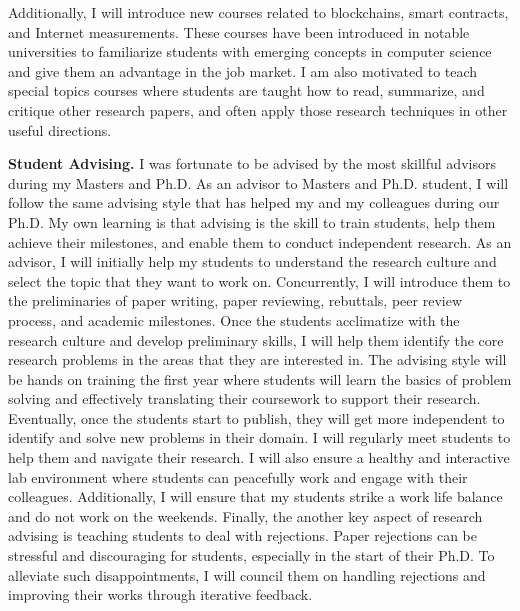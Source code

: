 \documentclass{NSF}
\newcommand{\BfPara}[1]{{\noindent\textbf{#1.}}\xspace}
\begin{document}
Additionally, I will introduce new courses related to blockchains, smart contracts, and Internet measurements. These courses have been introduced in notable universities to familiarize students with emerging concepts in computer science and give them an advantage in the job market. I am also motivated to teach special topics courses where students are taught how to read, summarize, and critique other research papers, and often apply those research techniques in other useful directions. 


\vspace{2mm}
\BfPara{Student Advising} I was fortunate to be advised by the most skillful advisors during my Masters and Ph.D. As an advisor to Masters and Ph.D. student, I will follow the same advising style that has helped my and my colleagues during our Ph.D. My own learning is that advising is the skill to train students, help them achieve their milestones, and enable them to conduct independent research. As an advisor, I will initially help my students to understand the research culture and select the topic that they want to work on. Concurrently, I will introduce them to the preliminaries of paper writing, paper reviewing, rebuttals, peer review process, and academic milestones. Once the students acclimatize with the research culture and develop preliminary skills, I will help them identify the core research problems in the areas that they are interested in. The advising style will be hands on training the first year where students will learn the basics of problem solving and effectively translating their coursework to support their research. Eventually, once the students start to publish, they will get more independent to identify and solve new problems in their domain. I will regularly meet students to help them and navigate their research. I will also ensure a healthy and interactive lab environment where students can peacefully work and engage with their colleagues. Additionally, I will ensure that my students strike a work life balance and do not work on the weekends. Finally, the another key aspect of research advising is teaching students to deal with rejections. Paper rejections can be stressful and discouraging for students, especially in the start of their Ph.D. To alleviate such disappointments, I will council them on handling rejections and improving their works through iterative feedback. 

\end{document}

